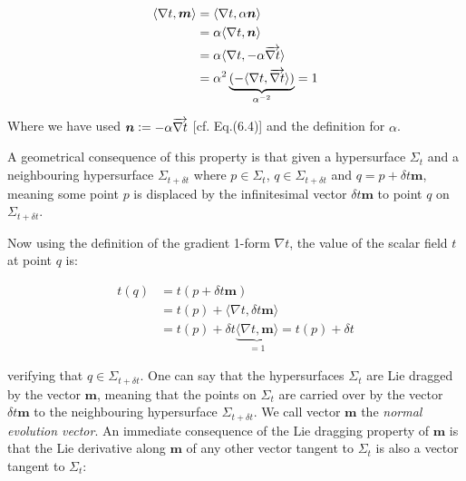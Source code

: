 \documentclass[12pt]{article}
\renewcommand{\vec}[1]{\bm{#1}}
\numberwithin{equation}{section}
\numberwithin{theorem}{subsection}
\newcommand{\defeq}{\vcentcolon=}
\begin{document}
\begin{align}

    \langle \nabla t, \vec{m} \rangle &= \langle \nabla t, \alpha \vec{n} \rangle \notag  \\

    &= \alpha \langle \nabla t, \vec{n} \rangle \notag \\

    &= \alpha \langle \nabla t, - \alpha \overrightarrow{\nabla t} \rangle \notag \\

    &= \alpha^{2}\underbrace{(-\langle \nabla t, \overrightarrow{\nabla t} \rangle)}_{\alpha^{-2}} = 1 

\end{align}

Where we have used $\vec{n} \defeq - \alpha \overrightarrow{\nabla t}$ [cf. Eq.(6.4)] and the definition for $\alpha$.

\newline 

A geometrical consequence of this property is that given a hypersurface $\Sigma_{t}$ and a neighbouring hypersurface $\Sigma_{t+\delta t}$ where $p \in \Sigma_{t}$, $q \in \Sigma_{t+\delta t}$ and $q=p+\delta t \vec{m}$, meaning some point $p$ is displaced by the infinitesimal vector $\delta t \vec{m}$ to point $q$ on $\Sigma_{t+\delta t}$. \newline

Now using the definition of the gradient 1-form $\nabla t$, the value of the scalar field $t$ at point $q$ is:

\begin{align*}

    t(q) &= t(p+\delta t \vec{m}) \\

    &= t(p) + \langle \nabla t, \delta t \vec{m} \rangle \\

    &= t(p) + \delta t \underbrace{\langle \nabla t, \vec{m} \rangle}_{=1} 

    = t(p) + \delta t

\end{align*}

verifying that $q \in \Sigma_{t+\delta t}$. One can say that the hypersurfaces $\Sigma_{t}$ are Lie dragged by the vector $\vec{m}$, meaning that the points on $\Sigma_{t}$ are carried over by the vector $\delta t \vec{m}$ to the neighbouring hypersurface $\Sigma_{t+\delta t}$. We call vector $\vec{m}$ the \textit{normal evolution vector}. An immediate consequence of the Lie dragging property of $\vec{m}$ is that the Lie derivative along $\vec{m}$ of any other vector tangent to $\Sigma_{t}$ is also a vector tangent to $\Sigma_{t}$:
\end{document}
